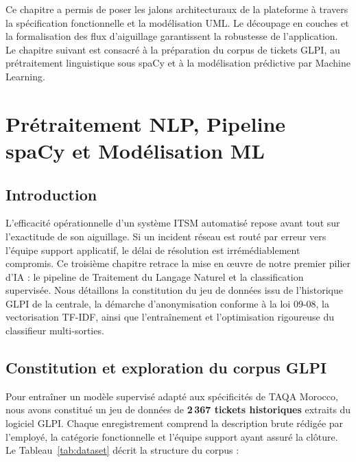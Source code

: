 \documentclass[12pt, a4paper, oneside]{report}
\begin{document}
Ce chapitre a permis de poser les jalons architecturaux de la plateforme à travers la spécification fonctionnelle et la modélisation UML. Le découpage en couches et la formalisation des flux d'aiguillage garantissent la robustesse de l'application. Le chapitre suivant est consacré à la préparation du corpus de tickets GLPI, au prétraitement linguistique sous spaCy et à la modélisation prédictive par Machine Learning.

\newpage
\chapter{Prétraitement NLP, Pipeline spaCy et Modélisation ML}

\section{Introduction}

L'efficacité opérationnelle d'un système ITSM automatisé repose avant tout sur l'exactitude de son aiguillage. Si un incident réseau est routé par erreur vers l'équipe support applicatif, le délai de résolution est irrémédiablement compromis. Ce troisième chapitre retrace la mise en œuvre de notre premier pilier d'IA : le pipeline de Traitement du Langage Naturel et la classification supervisée. Nous détaillons la constitution du jeu de données issu de l'historique GLPI de la centrale, la démarche d'anonymisation conforme à la loi 09-08, la vectorisation TF-IDF, ainsi que l'entraînement et l'optimisation rigoureuse du classifieur multi-sorties.

\section{Constitution et exploration du corpus GLPI}

Pour entraîner un modèle supervisé adapté aux spécificités de TAQA Morocco, nous avons constitué un jeu de données de \textbf{2\,367 tickets historiques} extraits du logiciel GLPI. Chaque enregistrement comprend la description brute rédigée par l'employé, la catégorie fonctionnelle et l'équipe support ayant assuré la clôture. Le Tableau~\ref{tab:dataset} décrit la structure du corpus :
\end{document}
